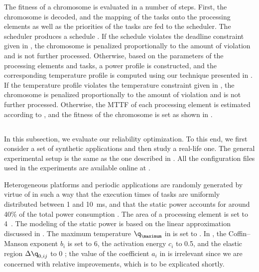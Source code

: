 The fitness of a chromosome is evaluated in a number of steps. First, the
chromosome is decoded, and the mapping of the tasks onto the processing elements
as well as the priorities of the tasks are fed to the scheduler. The scheduler
produces a schedule \schedule. If the schedule violates the deadline constraint
given in , the chromosome is penalized
proportionally to the amount of violation and is not further processed.
Otherwise, based on the parameters of the processing elements and tasks, a power
profile \mp is constructed, and the corresponding temperature profile \mq is
computed using our technique presented in . If the
temperature profile violates the temperature constraint given in
, the chromosome is penalized proportionally
to the amount of violation and is not further processed. Otherwise, the
\ac{MTTF} of each processing element is estimated according to
, and the fitness of the chromosome is set as
shown in .

\subsection{\resultstitle}

In this subsection, we evaluate our reliability optimization. To this end, we
first consider a set of synthetic applications and then study a real-life one.
The general experimental setup is the same as the one described in
. All the configuration files used in the
experiments are available online at \cite{eslab2012}.

Heterogeneous platforms and periodic applications are randomly generated by
virtue of  \cite{dick1998} in such a way that the execution times of
tasks are uniformly distributed between 1 and 10~ms, and that the static power
accounts for around 40\% of the total power consumption \cite{liu2007}. The area
of a processing element is set to 4~. The modeling of the static
power is based on the linear approximation discussed in
. The maximum temperature $\q_\maximum$ in
 is set to . In
, the Coffin--Manson exponent $b_i$ is set to
6, the activation energy $c_i$ to 0.5, and the elastic region $\Delta \q_{0,
ij}$ to 0 \cite{jedec2016}; the value of the coefficient $a_i$ in
 is irrelevant since we are concerned with
relative improvements, which is to be explicated shortly.

